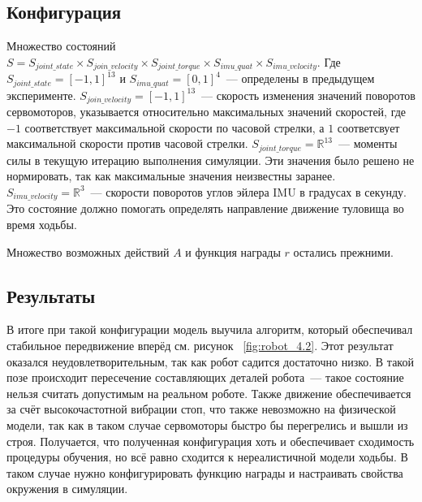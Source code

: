 \subsection{Конфигурация}\label{sec:ch2.1/sec5}

Множество состояний $S = S_{joint\_state} \times S_{join\_velocity} \times S_{joint\_torque} \times S_{imu\_quat} \times S_{imu\_velocity}$. Где $S_{joint\_state} = [-1, 1]^{13}$ и $S_{imu\_quat} = [0, 1]^4$~--- определены в предыдущем эксперименте. $S_{join\_velocity} = [-1, 1]^{13}$~--- скорость изменения значений поворотов сервомоторов, указывается относительно максимальных значений скоростей, где $-1$ соответствует максимальной скорости по часовой стрелки, а $1$ соответсвует максимальной скорости против часовой стрелки. $S_{joint\_torque} = \mathbb{R}^{13}$~--- моменты силы в текущую итерацию выполнения симуляции. Эти значения было решено не нормировать, так как максимальные значения неизвестны заранее. $S_{imu\_velocity}=\mathbb{R}^3$~--- скорости поворотов углов эйлера IMU в градусах в секунду. Это состояние должно помогать определять направление движение туловища во время ходьбы.

Множество возможных действий $A$ и функция награды $r$ остались прежними.


\subsection{Результаты}\label{sec:ch2.2/sec5}

В итоге при такой конфигурации модель выучила алгоритм, который обеспечивал стабильное передвижение вперёд см. рисунок ~\cref{fig:robot_4.2}. Этот результат оказался неудовлетворительным, так как робот садится достаточно низко. В такой позе происходит пересечение составляющих деталей робота~--- такое состояние нельзя считать допустимым на реальном роботе. Также движение обеспечивается за счёт высокочастотной вибрации стоп, что также невозможно на физической модели, так как в таком случае сервомоторы быстро бы перегрелись и вышли из строя. Получается, что полученная конфигурация хоть и обеспечивает сходимость процедуры обучения, но всё равно сходится к нереалистичной модели ходьбы. В таком случае нужно конфигурировать функцию награды и настраивать свойства окружения в симуляции.


